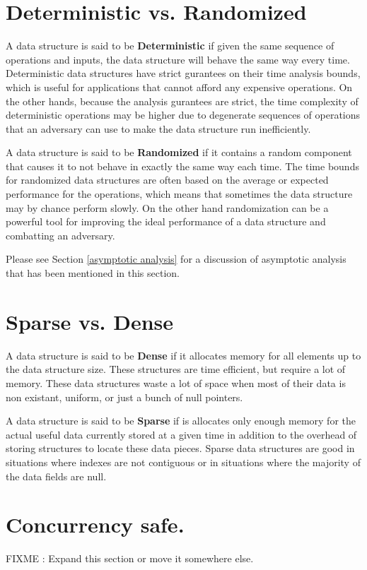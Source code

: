\documentclass[12pt, letterpaper]{book}
\begin{document}
\section{Deterministic vs. Randomized}

A data structure is said to be \textbf{Deterministic} if given the same sequence of operations and inputs, the data structure will behave the same way every time. Deterministic data structures have strict gurantees on their time analysis bounds, which is useful for applications that cannot afford any expensive operations. On the other hands, because the analysis gurantees are strict, the time complexity of deterministic operations may be higher due to degenerate sequences of operations that an adversary can use to make the data structure run inefficiently.

A data structure is said to be \textbf{Randomized} if it contains a random component that causes it to not behave in exactly the same way each time. The time bounds for randomized data structures are often based on the average or expected performance for the operations, which means that sometimes the data structure may by chance perform slowly. On the other hand randomization can be a powerful tool for improving the ideal performance of a data structure and combatting an adversary.

Please see Section \ref{asymptotic analysis} for a discussion of asymptotic analysis that has been mentioned in this section.

\section{Sparse vs. Dense}

A data structure is said to be \textbf{Dense} if it allocates memory for all elements up to the data structure size. These structures are time efficient, but require a lot of memory. These data structures waste a lot of space when most of their data is non existant, uniform, or just a bunch of null pointers.

A data structure is said to be \textbf{Sparse} if is allocates only enough memory for the actual useful data currently stored at a given time in addition to the overhead of storing structures to locate these data pieces. Sparse data structures are good in situations where indexes are not contiguous or in situations where the majority of the data fields are null.

\section{Concurrency safe.}
	FIXME : Expand this section or move it somewhere else.
\end{document}
